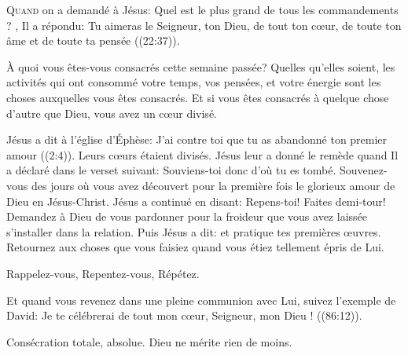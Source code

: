 

\lettrine{Q}{uand} on a demandé à Jésus:
 \Og Quel est le plus grand de tous les commandements ? \Fg{},
 Il a répondu: 
 \Og Tu aimeras le Seigneur, ton Dieu, de tout ton c\oe{}ur,
 de toute ton âme et de toute ta pensée \Fg{} ((22:37)). 

\`A quoi vous êtes-vous consacrés cette semaine passée?
 Quelles qu'elles soient, les activités qui ont consommé votre temps,
 vos pensées, et votre énergie sont les choses auxquelles
 vous êtes consacrés. Et si vous êtes consacrés à quelque chose
 d'autre que Dieu, vous avez un c\oe{}ur divisé. 


Jésus a dit à l'église d'Éphèse:
 \Og J'ai contre toi que tu as abandonné ton premier amour \Fg{}
 ((2:4)).
 Leurs c\oe{}urs étaient divisés. Jésus leur a donné le remède quand
 Il a déclaré dans le verset suivant:
 \Og Souviens-toi donc d'où tu es tombé. \Fg{}
 Souvenez-vous des jours où vous avez découvert pour la première fois
 le glorieux amour de Dieu en Jésus-Christ.
 Jésus a continué en disant: \Og Repens-toi! \Fg{} Faites demi-tour!
 Demandez à Dieu de vous pardonner pour la froideur que vous avez laissée
 s'installer dans la relation. Puis Jésus a dit:
 \Og et pratique tes premières \oe{}uvres. \Fg{}
 Retournez aux choses que vous faisiez quand vous étiez tellement épris de Lui. 

Rappelez-vous, Repentez-vous, Répétez. 

Et quand vous revenez dans une pleine communion avec Lui,
 suivez l'exemple de David:
 \Og Je te célébrerai de tout mon c\oe{}ur, Seigneur, mon Dieu ! \Fg{}
 ((86:12)).

Consécration totale, absolue. Dieu ne mérite rien de moins. 

\dvrule





